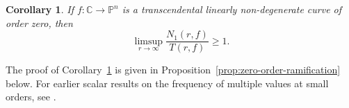 \documentclass[12pt,letterpaper,reqno]{amsart}
\newtheorem{thm}{Theorem}[section]
\newtheorem{cor}[thm]{Corollary}
\theoremstyle{definition}
\numberwithin{equation}{section}
\newcommand{\C}{\mathbb C}
\newcommand{\Z}{\mathbb Z}
\newcommand{\PP}{\mathbb P}
\newcommand{\fv}{\bm f}
\begin{document}


\begin{cor}\label{cor:zero-ratio}
If $f:\C\to\PP^{n}$ is a transcendental linearly non-degenerate curve
of order zero, then
\[
 \limsup_{r\to\infty}\frac{N_1(r,f)}{T(r,f)}\geq1.
\]
\end{cor}

The proof of Corollary~\ref{cor:zero-ratio} is given in
Proposition~\ref{prop:zero-order-ramification} below.
For earlier scalar results on the frequency of multiple values at small
orders, see \cite{She85}.
\end{document}
